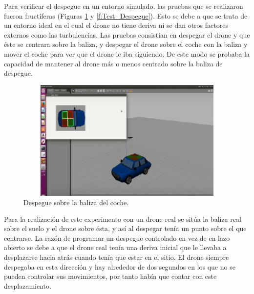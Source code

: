 \hspace{1cm} Para verificar el despegue en un entorno simulado, las pruebas que se realizaron fueron fruct\'iferas (Figuras \ref{fig:Despegue sobre la baliza del coche} y \ref{f:Test_Despegue}). Esto se debe a que se trata de un entorno ideal en el cual el drone no tiene deriva ni se dan otros factores externos como las turbulencias. Las pruebas consist\'ian en despegar el drone y que \'este se centrara sobre la baliza, y despegar el drone sobre el coche con la baliza y mover el coche para ver que el drone le iba siguiendo. De este modo se probaba la capacidad de mantener al drone m\'as o menos centrado sobre la baliza de despegue.%

\begin{figure}[H]
	\centering
		\includegraphics[width=13cm,height=6cm]{imgs/TakeOff.jpg}
        \caption{Despegue sobre la baliza del coche.}
	\label{fig:Despegue sobre la baliza del coche}
\end{figure}


\hspace{1cm} Para la realizaci\'on de este experimento con un drone real se sit\'ua la baliza real sobre el suelo y el drone sobre \'esta, y as\'i al despegar ten\'ia un punto sobre el que centrarse. La raz\'on de programar un despegue controlado en vez de en lazo abierto se debe a que el drone real ten\'ia una deriva inicial que le llevaba a desplazarse hacia atr\'as cuando ten\'ia que estar en el sitio. El drone siempre despegaba en esta direcci\'on y hay alrededor de dos segundos en los que no se pueden controlar sus movimientos, por tanto hab\'ia que contar con este desplazamiento. 

